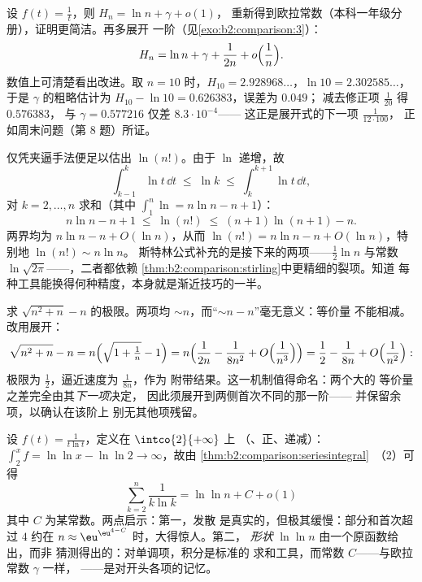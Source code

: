 \begin{example}[调和数的展开]\label{ex:b2:comparison:harmonic}
设 $f(t) = \frac1t$，则 $H_n = \ln n + \gamma + o(1)$，
重新得到欧拉常数（本科一年级分册），证明更简洁。再多展开
一阶（见\cref{exo:b2:comparison:3}）：
\[
H_n = \ln n + \gamma + \frac{1}{2n} + o\Bigl(\frac1n\Bigr).
\]
数值上可清楚看出改进。取 $n = 10$ 时，$H_{10} =
2.928968\dots$，$\ln 10 = 2.302585\dots$，于是
$\gamma$ 的粗略估计为 $H_{10} - \ln 10 = 0.626383$，误差为 $0.049$；
减去修正项 $\frac1{20}$ 得 $0.576383$，
与 $\gamma = 0.577216$ 仅差 $8.3\cdot10^{-4}$——
这正是展开式的下一项 $\frac{1}{12\cdot100}$，
正如周末问题（第 8 题）所证。
\end{example}

\begin{example}[不用斯特林公式的粗略 $\ln(n!)$]\label{ex:b2:comparison:lnfactorial}
仅凭夹逼手法便足以估出 $\ln(n!)$。由于
$\ln$ 递增，故
\[
\int_{k-1}^{k}\ln t\,\dd t \;\leq\; \ln k \;\leq\;
\int_{k}^{k+1}\ln t\,\dd t ,
\]
对 $k = 2, \dots, n$ 求和（其中 $\int_1^n\ln = n\ln n
- n + 1$）：
\[
n\ln n - n + 1 \;\leq\; \ln(n!) \;\leq\; (n+1)\ln(n+1) - n .
\]
两界均为 $n\ln n - n + O(\ln n)$，从而 $\ln(n!) = n\ln
n - n + O(\ln n)$，特别地 $\ln(n!) \sim n\ln n$。
斯特林公式补充的是接下来的两项——$\frac12\ln n$
与常数 $\ln\sqrt{2\pi}$——，二者都依赖
\cref{thm:b2:comparison:stirling}中更精细的裂项。知道
每种工具能换得何种精度，本身就是渐近技巧的一半。
\end{example}

\begin{example}[相消须借助展开]\label{ex:b2:comparison:cancellation}
求 $\sqrt{n^2 + n} - n$ 的极限。两项均
$\sim n$，而“$\sim n - n$”毫无意义：等价量
不能相减。改用展开：
\[
\sqrt{n^2 + n} - n
= n\Bigl(\sqrt{1 + \tfrac1n} - 1\Bigr)
= n\Bigl(\frac{1}{2n} - \frac{1}{8n^2} +
O\Bigl(\frac1{n^3}\Bigr)\Bigr)
= \frac12 - \frac{1}{8n} + O\Bigl(\frac1{n^2}\Bigr) :
\]
极限为 $\frac12$，逼近速度为 $\frac1{8n}$，作为
附带结果。这一机制值得命名：两个大的
等价量之差完全由其\emph{下一项}决定，
因此须展开到两侧首次不同的那一阶——
并保留余项，以确认在该阶上
别无其他项残留。
\end{example}

\begin{example}[发散比较的具体计算]\label{ex:b2:comparison:loglog}
设 $f(t) = \frac{1}{t\ln t}$，定义在 $\intco{2}{+\infty}$ 上
（、正、递减）：$\int_2^x f = \ln\ln x -
\ln\ln 2 \to \infty$，故由
\cref{thm:b2:comparison:seriesintegral}~（2）可得
\[
\sum_{k=2}^{n}\frac{1}{k\ln k} = \ln\ln n + C + o(1)
\]
其中 $C$ 为某常数。两点启示：第一，发散
是真实的，但极其缓慢：部分和首次超过 $4$ 约在 $n
\approx \eu^{\eu^{4 - C}}$ 时，大得惊人。第二，
\emph{形状} $\ln\ln n$ 由一个原函数给出，而非
猜测得出的：对单调项，积分是标准的
求和工具，而常数 $C$——与欧拉常数 $\gamma$ 一样，
——是对开头各项的记忆。
\end{example}

